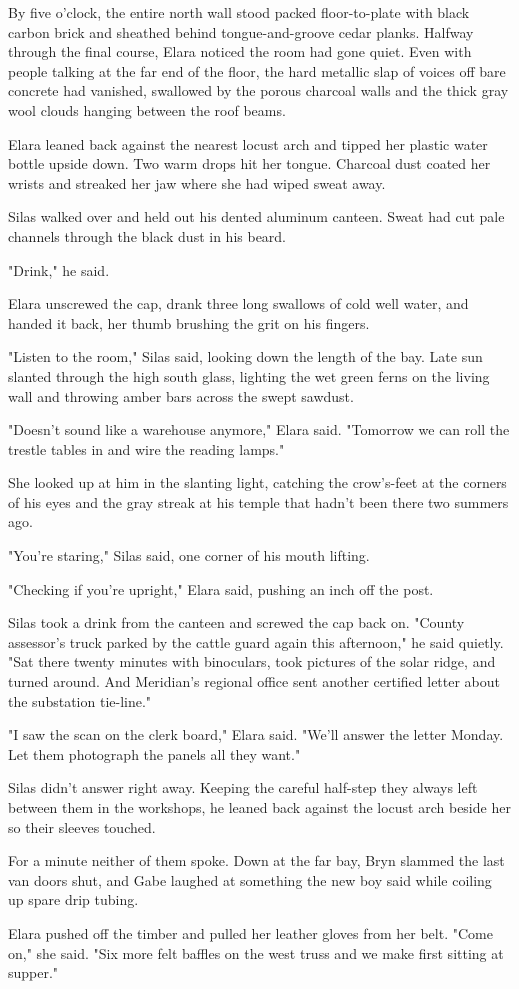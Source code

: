By five o'clock, the entire north wall stood packed floor-to-plate with black carbon brick and sheathed behind tongue-and-groove cedar planks. Halfway through the final course, Elara noticed the room had gone quiet. Even with people talking at the far end of the floor, the hard metallic slap of voices off bare concrete had vanished, swallowed by the porous charcoal walls and the thick gray wool clouds hanging between the roof beams.

Elara leaned back against the nearest locust arch and tipped her plastic water bottle upside down. Two warm drops hit her tongue. Charcoal dust coated her wrists and streaked her jaw where she had wiped sweat away.

Silas walked over and held out his dented aluminum canteen. Sweat had cut pale channels through the black dust in his beard.

"Drink," he said.

Elara unscrewed the cap, drank three long swallows of cold well water, and handed it back, her thumb brushing the grit on his fingers.

"Listen to the room," Silas said, looking down the length of the bay. Late sun slanted through the high south glass, lighting the wet green ferns on the living wall and throwing amber bars across the swept sawdust.

"Doesn't sound like a warehouse anymore," Elara said. "Tomorrow we can roll the trestle tables in and wire the reading lamps."

She looked up at him in the slanting light, catching the crow's-feet at the corners of his eyes and the gray streak at his temple that hadn't been there two summers ago.

"You're staring," Silas said, one corner of his mouth lifting.

"Checking if you're upright," Elara said, pushing an inch off the post.

Silas took a drink from the canteen and screwed the cap back on. "County assessor's truck parked by the cattle guard again this afternoon," he said quietly. "Sat there twenty minutes with binoculars, took pictures of the solar ridge, and turned around. And Meridian's regional office sent another certified letter about the substation tie-line."

"I saw the scan on the clerk board," Elara said. "We'll answer the letter Monday. Let them photograph the panels all they want."

Silas didn't answer right away. Keeping the careful half-step they always left between them in the workshops, he leaned back against the locust arch beside her so their sleeves touched.

For a minute neither of them spoke. Down at the far bay, Bryn slammed the last van doors shut, and Gabe laughed at something the new boy said while coiling up spare drip tubing.

Elara pushed off the timber and pulled her leather gloves from her belt. "Come on," she said. "Six more felt baffles on the west truss and we make first sitting at supper."
